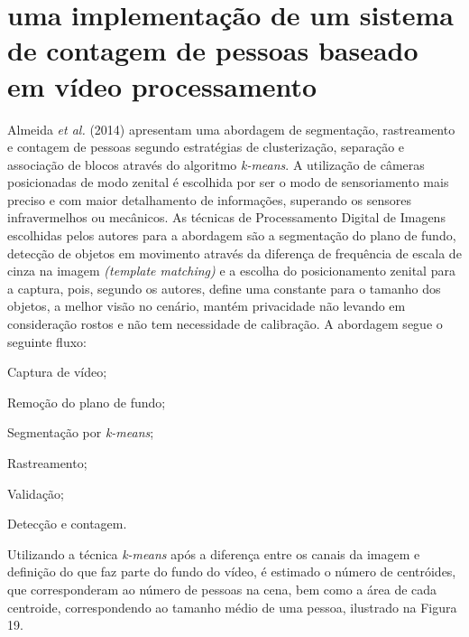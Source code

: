 \documentclass[12pt,oneside,a4paper,chapter=TITLE,section=TITLE,sumario=tradicional]{abntex2}
\begin{document}
\section{uma implementação de um sistema de contagem de pessoas baseado em vídeo processamento}
Almeida \textit{et al.} (2014) apresentam uma abordagem de segmentação, rastreamento e contagem de pessoas segundo estratégias de clusterização, separação e associação de blocos através do algoritmo \textit{k-means}. A utilização de câmeras posicionadas de modo zenital é escolhida por ser o modo de sensoriamento mais preciso e com maior detalhamento de informações, superando os sensores infravermelhos ou mecânicos.
As técnicas de Processamento Digital de Imagens escolhidas pelos autores para a abordagem são a segmentação do plano de fundo, detecção de objetos em movimento através da diferença de frequência de escala de cinza na imagem \textit{(template matching)} e a escolha do posicionamento zenital para a captura, pois, segundo os autores, define uma constante para o tamanho dos objetos, a melhor visão no cenário, mantém privacidade não levando em consideração rostos e não tem necessidade de calibração.
A abordagem segue o seguinte fluxo:
\begin{lista}
    \item Captura de vídeo;
    \item Remoção do plano de fundo;
    \item Segmentação por \textit{k-means};
    \item Rastreamento;
    \item Validação;
    \item Detecção e contagem.
\end{lista}
Utilizando a técnica \textit{k-means} após a diferença entre os canais da imagem e definição do que faz parte do fundo do vídeo, é estimado o número de centróides, que corresponderam ao número de pessoas na cena, bem como a área de cada centroide, correspondendo ao tamanho médio de uma pessoa, ilustrado na Figura 19.

\begin{figure}[htb]
\end{figure}
\end{document}

